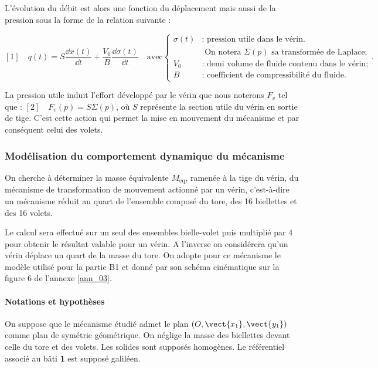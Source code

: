 \documentclass[10pt,fleqn]{article} %
\begin{document}
L'évolution du débit est alors une fonction du déplacement mais aussi de la pression sous la forme de la relation suivante :

$$ 
[1] \quad q(t)= S\dfrac{\dd x(t)}{\dd t} + \dfrac{V_0}{B} \dfrac{\dd \sigma(t) }{\dd t}
\quad \text{avec} 
\left\{
\begin{array}{ll}
\sigma(t) &\text{: pression utile dans le vérin.}  \\ 
& \text{    On notera }\Sigma(p)\text{ sa transformée de Laplace;}\\
V_0 &\text{: demi volume de fluide contenu dans le vérin;} \\
B &\text{: coefficient de compressibilité du fluide.}
\end{array}
\right. .
$$

La pression utile induit l'effort développé par le vérin que nous noterons $F_v$ tel que :
$[2] \quad F_v(p) = S\Sigma(p)$, où $S$ représente la section utile du vérin en sortie de tige.
C'est cette action qui permet la mise en mouvement du mécanisme et par conséquent celui des volets. 

\subsubsection{Modélisation du comportement dynamique du mécanisme  }
\begin{obj}
On cherche à déterminer la masse équivalente $M_{\text{eq}}$, ramenée à la tige du vérin, du mécanisme de transformation de mouvement actionné par un vérin, c'est-à-dire un mécanisme réduit au quart de l'ensemble composé du tore, des 16 biellettes et des 16 volets.
\end{obj}

Le calcul sera effectué sur un seul des ensembles bielle-volet puis multiplié par 4 pour obtenir le résultat valable pour un vérin. A l'inverse on considérera qu'un vérin déplace un quart de la masse du tore. On adopte pour ce mécanisme le modèle utilisé pour la partie B1 et donné par son schéma cinématique sur la figure 6 de l'annexe \ref{ann_03}.

\paragraph*{Notations et hypothèses}
On suppose que le mécanisme étudié admet le plan $\left(O,\vect{x_1}, \vect{y_1}\right)$ comme plan de symétrie géométrique. On néglige la masse des biellettes devant celle du tore et des volets. Les solides sont supposés homogènes. Le référentiel associé au bâti \textbf{1} est supposé galiléen.
\end{document}
